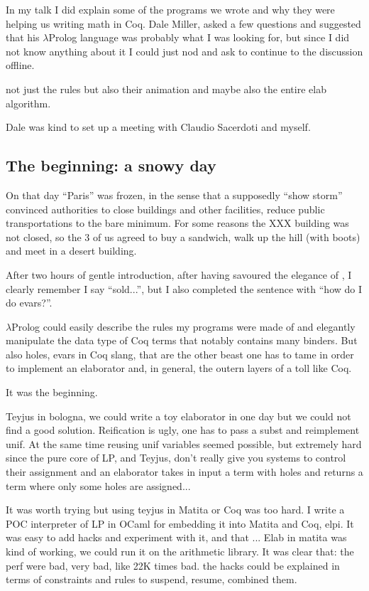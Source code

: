 \documentclass[a4paper, 11pt]{book}
\begin{document}
In my talk I did explain some of the programs we wrote and why they
were helping us writing math in Coq. Dale Miller, asked a few questions
and suggested that his $\lambda$Prolog language was probably what I
was looking for, but since I did not know anything about it I could
just nod and ask to continue to the discussion offline.

not just the rules but also their animation and maybe also the entire
elab algorithm.

Dale was kind
to set up a meeting with Claudio Sacerdoti and myself. 

\subsection{The beginning: a snowy day}

On that day ``Paris'' was frozen, in the sense that a supposedly
``show storm'' convinced authorities to close buildings and other facilities,
reduce public transportations to the bare minimum. For some reasons
the XXX building was not closed, so the 3 of us agreed to buy a sandwich,
walk up the hill (with boots) and meet in a desert building.

After two hours of gentle introduction, after having savoured the
elegance of , I clearly remember I say ``sold...'',
but I also completed the sentence with ``how do I do evars?''.

$\lambda$Prolog could easily describe the rules my programs were
made of and elegantly manipulate the data type of Coq terms that
notably contains many binders. But also holes, evars in Coq slang,
that are the other beast one has to tame in order to implement an
elaborator and, in general, the outern layers of a toll like Coq.

It was the beginning.

Teyjus in bologna, we could write a toy elaborator in one day
but we could not find a good solution. Reification is ugly, one has
to pass a subst and reimplement unif. At the same time reusing unif
variables seemed possible, but extremely hard since the pure core
of LP, and Teyjus, don't really give you systems to control their
assignment and an elaborator takes in input a term with holes
and returns a term where only some holes are assigned...

It was worth trying but using teyjus in Matita or Coq was too hard.
I write a POC interpreter of LP in OCaml for embedding it into
Matita and Coq, elpi. It was easy to add hacks and experiment with
it, and that ... Elab in matita was kind of working, we could run
it on the arithmetic library. It was clear that:
the perf were bad, very bad, like 22K times bad.
the hacks could be explained in terms of constraints and rules to
suspend, resume, combined them.
\end{document}
